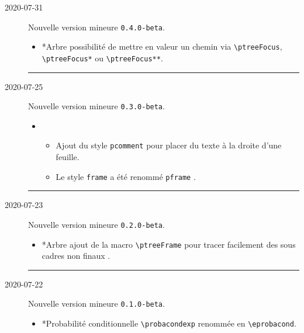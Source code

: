 \documentclass[12pt,a4paper]{article}
\makeatletter
\theoremstyle{definition}
\newcommand\topic{\@ifstar{\@topic@star}{\@topic@no@star}}
\newcommand\@topic@no@star[1]{%
    \textbf{\textsc{#1}.}%
}
\newcommand\@topic@star[1]{%
    \textbf{\textsc{#1} :}%
}
\newcommand\env[1]{\texttt{#1}}
\newcommand\macro[1]{\env{\textbackslash{}#1}}
\newcommand\separation{
    \medskip
    \hfill\rule{0.5\textwidth}{0.75pt}\hfill
    \medskip
}
\newcommand\prefix[1]{%
    \texttt{#1}%
}
\makeatother
\begin{document}
\begin{description}

    \medskip
    \item[2020-07-31] Nouvelle version mineure \verb+0.4.0-beta+.
    
    \begin{itemize}[itemsep=.5em]
        \item \topic*{Arbre}
        	  possibilité de mettre en valeur un chemin via \macro{ptreeFocus},  \macro{ptreeFocus*} ou \macro{ptreeFocus**}.
    \end{itemize}
    
    \separation

    \medskip
    \item[2020-07-25] Nouvelle version mineure \verb+0.3.0-beta+.
    
    \begin{itemize}[itemsep=.5em]
        \item \topic{Arbre}
        \begin{itemize}[itemsep=.5em]
            \item Ajout du style \prefix{pcomment} pour placer du texte à la droite d'une feuille.
    
            \item Le style \prefix{frame} a été renommé \prefix{pframe}.
        \end{itemize}
    \end{itemize}
    
    \separation

    \medskip
    \item[2020-07-23] Nouvelle version mineure \verb+0.2.0-beta+.
    
    \begin{itemize}[itemsep=.5em]
        \item \topic*{Arbre}
              ajout de la macro \macro{ptreeFrame} pour tracer facilement des sous cadres non \og finaux \fg.
    \end{itemize}
    
    \separation

    \medskip
    \item[2020-07-22] Nouvelle version mineure \verb+0.1.0-beta+.
    
    \begin{itemize}[itemsep=.5em]
        \item \topic*{Probabilité conditionnelle}
              \macro{probacondexp} renommée en  \macro{eprobacond}.
    

\end{itemize}
\end{description}
\end{document}
